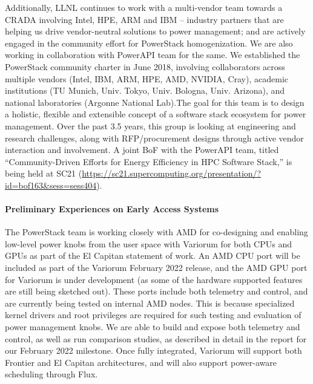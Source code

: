 Additionally, LLNL continues to work with a multi-vendor team towards a CRADA involving Intel, HPE, ARM and IBM -- industry partners that are helping us drive vendor-neutral solutions to power management; and are actively engaged in the community effort for PowerStack homogenization. We are also working in collaboration with PowerAPI team for the same. We established the PowerStack community charter in June 2018, involving collaborators across multiple vendors (Intel, IBM, ARM, HPE, AMD, NVIDIA, Cray), academic institutions (TU Munich, Univ. Tokyo, Univ. Bologna, Univ. Arizona), and national laboratories (Argonne National Lab).The goal for this team is to design a holistic, flexible and extensible concept of a software stack ecosystem for power management. Over the past 3.5 years, this group is looking at engineering and research challenges, along with RFP/procurement designs through active vendor interaction and involvement. A joint BoF with the PowerAPI team, titled ``Community-Driven Efforts for Energy Efficiency in HPC Software Stack,''  is being held at SC21 (\url{https://sc21.supercomputing.org/presentation/?id=bof163&sess=sess404}). 

\paragraph{Preliminary Experiences on Early Access Systems}
The PowerStack team is working closely with AMD for co-designing and enabling low-level power knobs from the user space with Variorum for both CPUs and GPUs as part of the El Capitan statement of work. An AMD CPU port will be included as part of the Variorum February 2022 release, and the AMD GPU port for Variorum is under development (as some of the hardware supported features are still being sketched out). These ports include both telemetry and control, and are currently being tested on internal AMD nodes. This is because specialized kernel drivers and root privileges are required for such testing and evaluation of power management knobs. We are able to build and expose both telemetry and control, as well as run comparison studies, as described in detail in the report for our February 2022 milestone. Once fully integrated, Variorum will support both Frontier and El Capitan architectures, and will also support power-aware scheduling through Flux. 

